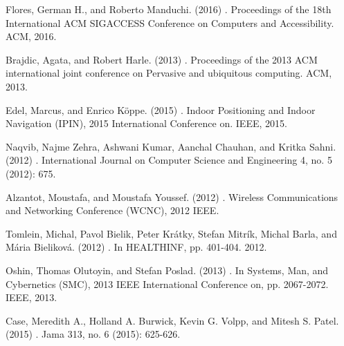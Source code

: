 \documentclass[11pt]{article}
\begin{document}
%
%

\begin{thebibliography}{}

Flores, German H., and Roberto Manduchi.
\newblock (2016)
.
\newblock Proceedings of the 18th International ACM SIGACCESS Conference on Computers and Accessibility. ACM, 2016.


Brajdic, Agata, and Robert Harle.
\newblock (2013)
.
\newblock Proceedings of the 2013 ACM international joint conference on Pervasive and ubiquitous computing. ACM, 2013.


Edel, Marcus, and Enrico Köppe.
\newblock (2015)
.
\newblock Indoor Positioning and Indoor Navigation (IPIN), 2015 International Conference on. IEEE, 2015.


Naqvib, Najme Zehra, Ashwani Kumar, Aanchal Chauhan, and Kritka Sahni.
\newblock (2012)
.
\newblock International Journal on Computer Science and Engineering 4, no. 5 (2012): 675.


Alzantot, Moustafa, and Moustafa Youssef.
\newblock (2012)
.
\newblock Wireless Communications and Networking Conference (WCNC), 2012 IEEE.
	

Tomlein, Michal, Pavol Bielik, Peter Krátky, Stefan Mitrík, Michal Barla, and Mária Bieliková.
\newblock (2012)
.
\newblock In HEALTHINF, pp. 401-404. 2012.


Oshin, Thomas Olutoyin, and Stefan Poslad.
\newblock (2013)
.
\newblock In Systems, Man, and Cybernetics (SMC), 2013 IEEE International Conference on, pp. 2067-2072. IEEE, 2013.


Case, Meredith A., Holland A. Burwick, Kevin G. Volpp, and Mitesh S. Patel.
\newblock (2015)
.
\newblock Jama 313, no. 6 (2015): 625-626.



\end{thebibliography}
\end{document}

